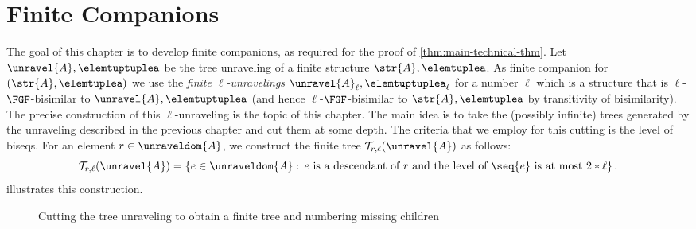 \chapter{Finite Companions}\label{chap:finite}
The goal of this chapter is to develop finite companions, as required for the proof of \cref{thm:main-technical-thm}.
Let $\unravel{A}, \elemtuptuplea$ be the tree unraveling of a finite structure $\str{A}, \elemtuplea$.
As finite companion for $(\str{A}, \elemtuplea)$ we use the \emph{finite $\ell$-unravelings} $\unravel{A}_{\ell}, \elemtuptuplea_{\ell}$ for a number $\ell$ which is a structure that is $\ell$-$\FGF$-bisimilar to $\unravel{A}, \elemtuptuplea$ (and hence $\ell$-$\FGF$-bisimilar to $\str{A}, \elemtuplea$ by transitivity of bisimilarity).
The precise construction of this $\ell$-unraveling is the topic of this chapter.
The main idea is to take the (possibly infinite) trees generated by the unraveling described in the previous chapter and cut them at some depth.
The criteria that we employ for this cutting is the level of biseqs.
For an element $r \in \unraveldom{A}$, we construct the finite tree $\mathcal{T}_{r,\ell}(\unravel{A})$ as follows:
\begin{equation*}
  \mathcal{T}_{r,\ell}(\unravel{A}) = \left\{ e \in \unraveldom{A}:\, e\ \text{is a descendant of $r$ and the level of $\seq{e}$ is at most $2 * \ell$} \right\}.
\end{equation*}
 illustrates this construction.
\begin{figure}[H]%
  \centering
  
  \caption{Cutting the tree unraveling to obtain a finite tree and numbering missing children}\label{fig:cutting}
\end{figure}%

